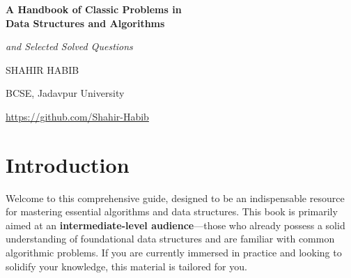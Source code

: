 

% 

\thispagestyle{empty}
\begin{center}
  {\Huge\bfseries A Handbook of Classic Problems in\\
    Data Structures and Algorithms\par}
  \vspace{1.5em}
  {\Large\itshape and Selected Solved Questions\par}
  \vfill
  {\Large\scshape SHAHIR HABIB}\


    {BCSE, Jadavpur University\par}
  \vspace{2em}
  \url{https://github.com/Shahir-Habib}\par
  \vfill
\end{center}
\clearpage

\frontmatter
\chapter*{Introduction}
\onehalfspacing
\justifying

Welcome to this comprehensive guide, designed to be an indispensable resource for mastering essential algorithms and data structures. This book is primarily aimed at an \textbf{intermediate-level audience}—those who already possess a solid understanding of foundational data structures and are familiar with common algorithmic problems. If you are currently immersed in practice and looking to solidify your knowledge, this material is tailored for you.

